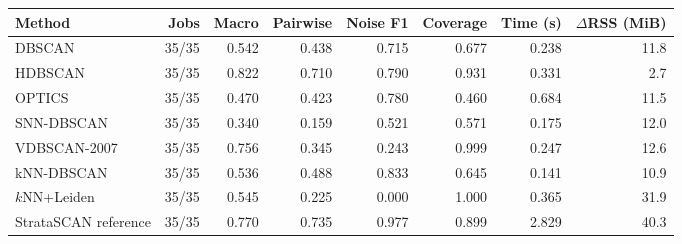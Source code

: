 \begin{tabular}{lrrrrrrr}
\toprule
Method & Jobs & Macro & Pairwise & Noise F1 & Coverage & Time (s) & $\Delta$RSS (MiB) \\
\midrule
DBSCAN & 35/35 & 0.542 & 0.438 & 0.715 & 0.677 & 0.238 & 11.8 \\
HDBSCAN & 35/35 & 0.822 & 0.710 & 0.790 & 0.931 & 0.331 & 2.7 \\
OPTICS & 35/35 & 0.470 & 0.423 & 0.780 & 0.460 & 0.684 & 11.5 \\
SNN-DBSCAN & 35/35 & 0.340 & 0.159 & 0.521 & 0.571 & 0.175 & 12.0 \\
VDBSCAN-2007 & 35/35 & 0.756 & 0.345 & 0.243 & 0.999 & 0.247 & 12.6 \\
kNN-DBSCAN & 35/35 & 0.536 & 0.488 & 0.833 & 0.645 & 0.141 & 10.9 \\
$k$NN+Leiden & 35/35 & 0.545 & 0.225 & 0.000 & 1.000 & 0.365 & 31.9 \\
StrataSCAN reference & 35/35 & 0.770 & 0.735 & 0.977 & 0.899 & 2.829 & 40.3 \\
\bottomrule
\end{tabular}
